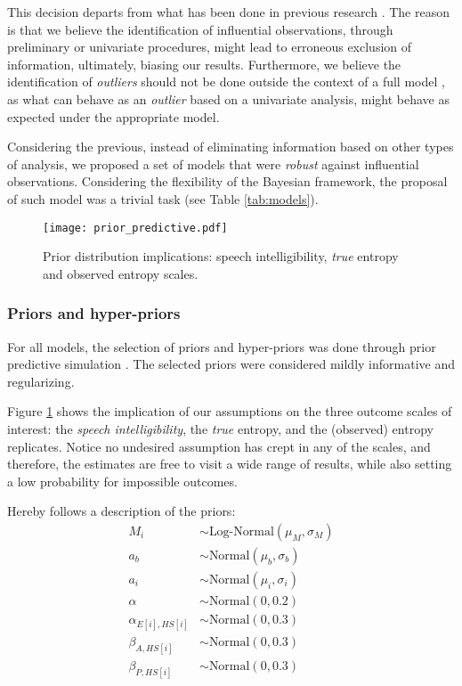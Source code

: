 This decision departs from what has been done in previous research \cite{Boonen_et_al_2020, vanDaal_2020, Boonen_et_al_2021}. The reason is that we believe the identification of influential observations, through preliminary or univariate procedures, might lead to erroneous exclusion of information, ultimately, biasing our results. Furthermore, we believe the identification of \textit{outliers} should not be done outside the context of a full model \citep{McElreath_2020}, as what can behave as an \textit{outlier} based on a univariate analysis, might behave as expected under the appropriate model.

Considering the previous, instead of eliminating information based on other types of analysis, we proposed a set of models that were \textit{robust} against influential observations. Considering the flexibility of the Bayesian framework, the proposal of such model was a trivial task (see Table \ref{tab:models}).
%
%
%
\begin{figure}[!h]
	\centering
	\texttt{[image: prior\_predictive.pdf]}
	\caption[Prior distribution implications]{Prior distribution implications: speech intelligibility, \textit{true} entropy and observed entropy scales.}
	\label{fig:priors}
\end{figure}
%
%
\subsubsection{Priors and hyper-priors}
%
For all models, the selection of priors and hyper-priors was done through prior predictive simulation \citep{McElreath_2020}. The selected priors were considered mildly informative and regularizing. 

Figure \ref{fig:priors} shows the implication of our assumptions on the three outcome scales of interest: the \textit{speech intelligibility}, the \textit{true} entropy, and the (observed) entropy replicates. Notice no undesired assumption has crept in any of the scales, and therefore, the estimates are free to visit a wide range of results, while also setting a low probability for impossible outcomes.

Hereby follows a description of the priors:
%
\begin{align}
	M_{i} & \sim \text{Log-Normal}( \mu_{M}, \sigma_{M}) \\
	a_{b} & \sim \text{Normal}(\mu_{b}, \sigma_{b}) \\
	a_{i} & \sim \text{Normal}(\mu_{i}, \sigma_{i}) \\
	\alpha & \sim \text{Normal}(0, 0.2) \\
	\alpha_{E[i],HS[i]} & \sim \text{Normal}(0, 0.3) \\
	\beta_{A, HS[i]} & \sim \text{Normal}(0 , 0.3) \\
	\beta_{P, HS[i]} & \sim \text{Normal}(0, 0.3)
\end{align}

